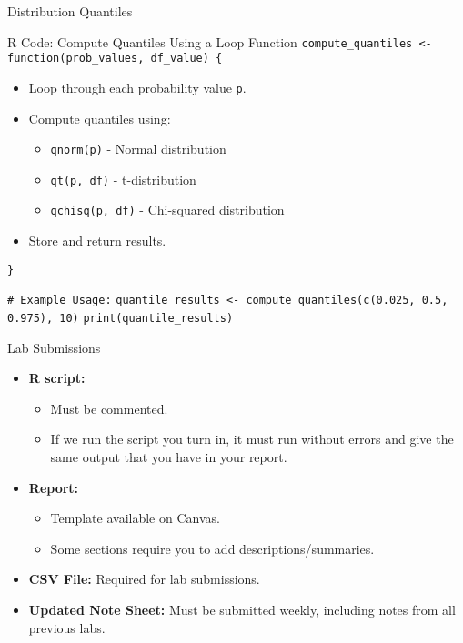 \documentclass{beamer}
\begin{document}
\begin{frame}{Distribution Quantiles}

    \begin{block}{R Code: Compute Quantiles Using a Loop Function}
\texttt{compute\_quantiles <- function(prob\_values, df\_value) \{}
\begin{itemize}
    \item Loop through each probability value \texttt{p}.
    \item Compute quantiles using:
    \begin{itemize}
        \item \texttt{qnorm(p)} - Normal distribution
        \item \texttt{qt(p, df)} - t-distribution
        \item \texttt{qchisq(p, df)} - Chi-squared distribution
    \end{itemize}
    \item Store and return results.
\end{itemize}
\texttt{\}}

\texttt{\# Example Usage:}  
\texttt{quantile\_results <- compute\_quantiles(c(0.025, 0.5, 0.975), 10)}  
\texttt{print(quantile\_results)}
    \end{block}

\end{frame}

\begin{frame}{Lab Submissions}
    \begin{itemize}
        \item \textbf{R script:}
        \begin{itemize}
            \item Must be commented.
            \item If we run the script you turn in, it must run without errors and give the same output that you have in your report.
        \end{itemize}

        \item \textbf{Report:}
        \begin{itemize}
            \item Template available on Canvas.
            \item Some sections require you to add descriptions/summaries.
        \end{itemize}

        \item \textbf{CSV File:} Required for lab submissions.

        \item \textbf{Updated Note Sheet:} Must be submitted weekly, including notes from all previous labs.
    \end{itemize}
\end{frame}
\end{document}
